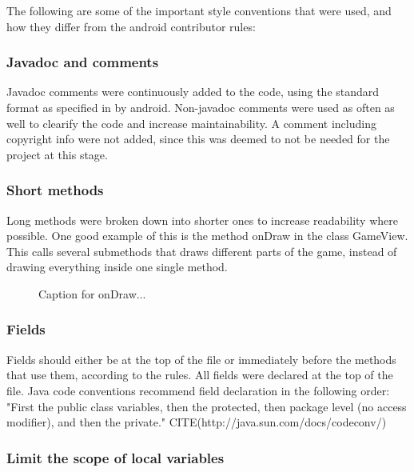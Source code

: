 The following are some of the important style conventions that were used, and how they differ from the android contributor rules:

\subsubsection{Javadoc and comments}

Javadoc comments were continuously added to the code, using the standard format as specified in by android. Non-javadoc comments were used as often as well to clearify the code and increase maintainability. A comment including copyright info were not added, since this was deemed to not be needed for the project at this stage.

\subsubsection{Short methods}

Long methods were broken down into shorter ones to increase readability where possible. One good example of this is the method onDraw in the class GameView. This calls several submethods that draws different parts of the game, instead of drawing everything inside one single method.

\begin{figure}[htb]
\begin{small}

\end{small}
\caption{Caption for onDraw...}
\label{fig:codeExOnDraw}
\end{figure}

\subsubsection{Fields}

Fields should either be at the top of the file or immediately before the methods that use them, according to the rules. All fields were declared at the top of the file. Java code conventions recommend field declaration in the following order: "First the public class variables, then the protected, then package level (no access modifier), and then the private." CITE(http://java.sun.com/docs/codeconv/)

\subsubsection{Limit the scope of local variables}

